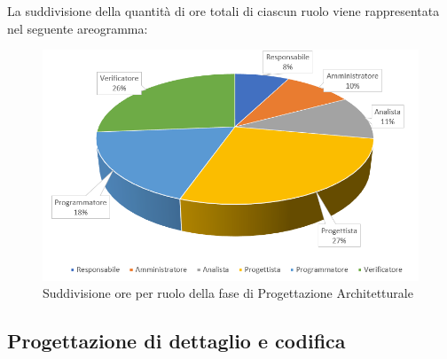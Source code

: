 La suddivisione della quantità di ore totali di ciascun ruolo viene rappresentata nel seguente areogramma:

\begin{figure}[h]
	\centering
	\caption{Suddivisione ore per ruolo della fase di Progettazione Architetturale}
	\includegraphics[scale=2]{sezioni/Aerogrammi/AerogrammaProgettArchitetturale.png}
\end{figure}

\clearpage
\subsection{Progettazione di dettaglio e codifica}

